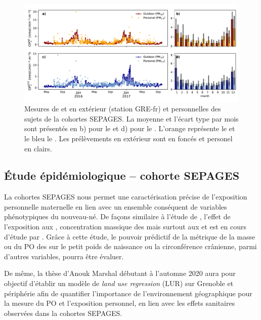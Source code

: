 \begin{figure}[ht]
    \centering
    \includegraphics[width=1.0\linewidth]{figures/chapter05/personnal_OP.pdf}
    \caption{Mesures de \POAAv{} et \PODTTv{} en extérieur (station GRE-fr) et
    personnelles des sujets de la cohortes SEPAGES. La moyenne et l'écart type par mois
sont présentés en b) pour le \POAAv{} et d) pour le \PODTTv. L'orange représente le
\POAAv{} et le bleu le \PODTTv{}. Les prélèvements en extérieur sont en foncés et personel
en clairs.}%
    \label{fig:figures/chapter05/personnal_OP}
\end{figure}

\subsection{Étude épidémiologique -- cohorte SEPAGES}

La cohortes SEPAGES nous permet une caractérisation précise de l'exposition personnelle
maternelle en lien avec un ensemble conséquent de variables phénotypiques du nouveau-né.
De façons similaire à l'étude de \cite{ouidirEstimation2015}, l'effet de l'exposition aux
, concentration massique des \PMdc mais surtout aux \POAAv{} et \PODTTv{} est en
cours d'étude par \cite{borlazaPersonalinprep.}.
Grâce à cette étude, le pouvoir prédictif de la métrique de la masse ou du PO des \PMdc{}
sur le petit poids de naissance ou la circonférence crânienne, parmi d'autres variables,
pourra être évaluer.

De même, la thèse d'Anouk Marshal débutant à l'automne 2020 aura pour objectif d'établir
un modèle de \textit{land use regression} (LUR) sur Grenoble et périphérie afin de
quantifier l'importance de l'environnement géographique pour la mesure du PO et
l'exposition personnel, en lien avec les effets sanitaires observées dans la
cohortes SEPAGES.


